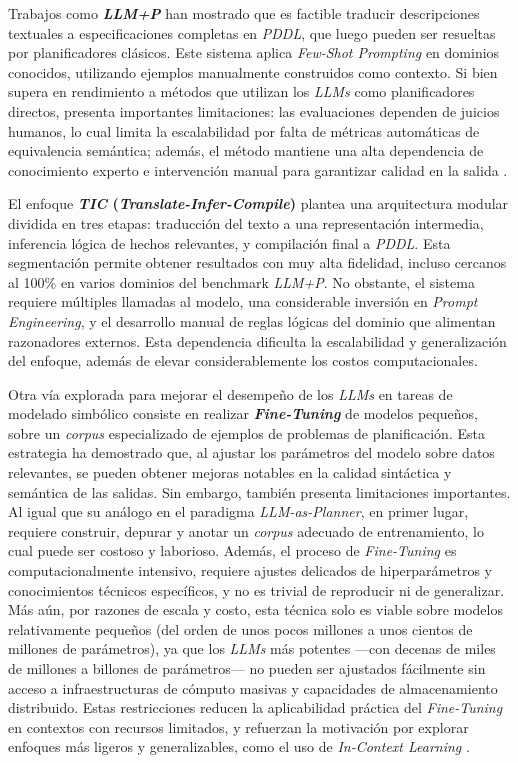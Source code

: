 Trabajos como \textbf{\textit{LLM+P}} \parencite{liu2023llm+} han mostrado que es factible traducir descripciones textuales a especificaciones completas en \textit{PDDL}, que luego pueden ser resueltas por planificadores clásicos. Este sistema aplica \textit{Few-Shot Prompting} en dominios conocidos, utilizando ejemplos manualmente construidos como contexto. Si bien supera en rendimiento a métodos que utilizan los \textit{LLMs} como planificadores directos, presenta importantes limitaciones: las evaluaciones dependen de juicios humanos, lo cual limita la escalabilidad por falta de métricas automáticas de equivalencia semántica; además, el método mantiene una alta dependencia de conocimiento experto e intervención manual para garantizar calidad en la salida \parencite{liu2023llm+, xie2023translating, tantakoun2025llms}.

El enfoque \textbf{\textit{TIC} (\textit{Translate-Infer-Compile})} \parencite{agarwal2024tic} plantea una arquitectura modular dividida en tres etapas: traducción del texto a una representación intermedia, inferencia lógica de hechos relevantes, y compilación final a \textit{PDDL}. Esta segmentación permite obtener resultados con muy alta fidelidad, incluso cercanos al 100\% en varios dominios del benchmark \textit{LLM+P}. No obstante, el sistema requiere múltiples llamadas al modelo, una considerable inversión en \textit{Prompt Engineering}, y el desarrollo manual de reglas lógicas del dominio que alimentan razonadores externos. Esta dependencia dificulta la escalabilidad y generalización del enfoque, además de elevar considerablemente los costos computacionales.

Otra vía explorada para mejorar el desempeño de los \textit{LLMs} en tareas de modelado simbólico consiste en realizar \textbf{\textit{Fine-Tuning}} \parencite{zeng2023agenttuning, zuo2024planetarium} de modelos pequeños, sobre un \textit{corpus} especializado de ejemplos de problemas de planificación. Esta estrategia ha demostrado que, al ajustar los parámetros del modelo sobre datos relevantes, se pueden obtener mejoras notables en la calidad sintáctica y semántica de las salidas. Sin embargo, también presenta limitaciones importantes. Al igual que su análogo en el paradigma \textit{LLM-as-Planner}, en primer lugar, requiere construir, depurar y anotar un \textit{corpus} adecuado de entrenamiento, lo cual puede ser costoso y laborioso. Además, el proceso de \textit{Fine-Tuning} es computacionalmente intensivo, requiere ajustes delicados de hiperparámetros y conocimientos técnicos específicos, y no es trivial de reproducir ni de generalizar. Más aún, por razones de escala y costo, esta técnica solo es viable sobre modelos relativamente pequeños (del orden de unos pocos millones a unos cientos de millones de parámetros), ya que los \textit{LLMs} más potentes —con decenas de miles de millones a billones de parámetros— no pueden ser ajustados fácilmente sin acceso a infraestructuras de cómputo masivas y capacidades de almacenamiento distribuido. Estas restricciones reducen la aplicabilidad práctica del \textit{Fine-Tuning} en contextos con recursos limitados, y refuerzan la motivación por explorar enfoques más ligeros y generalizables, como el uso de \textit{In-Context Learning} \parencite{dong2022survey, wang2023learning}.


